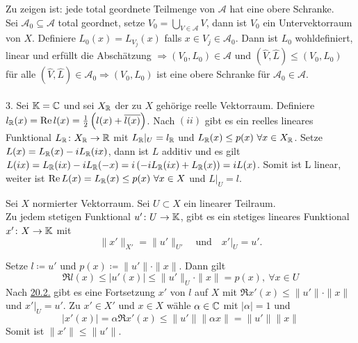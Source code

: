 \begin{beweis}
	Zu zeigen ist: jede total geordnete Teilmenge von $\mathcal{A}$ hat eine obere Schranke. \\
	Sei $\mathcal{A}_{0}  \subseteq \mathcal{A}$ total geordnet, setze $V_{0} = \bigcup_{V \in \mathcal{A}} V$, dann ist $V_{0}$ ein Untervektorraum von $X$. Definiere $L_{0}(x) = L_{V_{j}}(x)$ falls $x \in V_{j} \in \mathcal{A}_{0}$. Dann ist $L_{0}$ wohldefiniert, linear und erfüllt die Abschätzung $\Rightarrow (V_{0}, L_{0}) \in \mathcal{A}$ und $(\hat{V}, \hat{L}) \leq (V_{0}, L_{0})$ für alle $(\hat{V}, \hat{L}) \in \mathcal{A}_{0} \Rightarrow (V_{0}, L_{0})$ ist eine obere Schranke für $\mathcal{A}_{0} \in \mathcal{A}$. \\ \\
	3. Sei $\mathbb{K} = \mathbb{C}$ und sei $X_{\mathbb{R}}$ der zu $X$ gehörige reelle Vektorraum. Definiere $l_{\mathbb{R}}(x) = \mathop{\rm Re}\nolimits l(x) = \frac{1}{2} \left( l(x) + \overline{l(x)} \right)$. Nach $(ii)$ gibt es ein reelles lineares Funktional $L_{\mathbb{R}} \colon X_{\mathbb{R}} \rightarrow \mathbb{R}$ mit $L_{\mathbb{R}}|_{U} = l_{\mathbb{R}}$ und $L_{\mathbb{R}}(x) \leq p(x) ~ \forall x \in X_{\mathbb{R}}$. Setze $L(x) = L_{\mathbb{R}}(x) - i L_{\mathbb{R}}(ix)$, dann ist $L$ additiv und es gilt $L(ix) = L_{\mathbb{R}}(ix) - i L_{\mathbb{R}}(-x) = i \left( - i L_{\mathbb{R}}(ix) + L_{\mathbb{R}}(x) \right) = i L(x)$. Somit ist L linear, weiter ist $\mathop{\rm Re}\nolimits L(x) = L_{\mathbb{R}}(x) \leq p(x) ~ \forall x \in X$ und $L|_{U} = l$.
\end{beweis}


\begin{satz} \label{satz:20.3-Hahn-Banach} 
	Sei $X$ normierter Vektorraum. Sei $U \subset X$ ein linearer Teilraum. \\
	Zu jedem stetigen Funktional $u' \colon U \rightarrow \mathbb{K}$, gibt es ein stetiges lineares Funktional $x' \colon X \rightarrow \mathbb{K}$ mit 
		\[ \| x' \|_{X'} = \| u' \|_{U'} \quad \text{und} \quad x'|_{U} = u'. \]	
\end{satz}

\begin{beweis}
	Setze $l \coloneqq u'$ und $p(x) \coloneqq \| u'\| \cdot \| x \|$. Dann gilt 
		\[ \Re l(x) \leq | u'(x) | \leq \| u' \|_{U} \cdot \| x \| = p(x), ~ \forall x \in U \]
	Nach \hyperref[satz:20.2-Hahn-Banach]{20.2.} gibt es eine Fortsetzung $x'$ von $l$ auf $X$ mit $\Re x'(x) \leq \| u' \| \cdot \| x \|$ und $x'|_{U} = u'$.	Zu $x' \in X'$ und $x \in X$ wähle $\alpha \in \mathbb{C}$ mit $|\alpha| = 1$ und 
	\[ | x'(x) | = \alpha \Re x'(x) \leq \| u' \| \| \alpha x \| = \| u' \| \| x \|\]
	Somit ist $\| x' \| \leq \| u' \|$.
\end{beweis}


